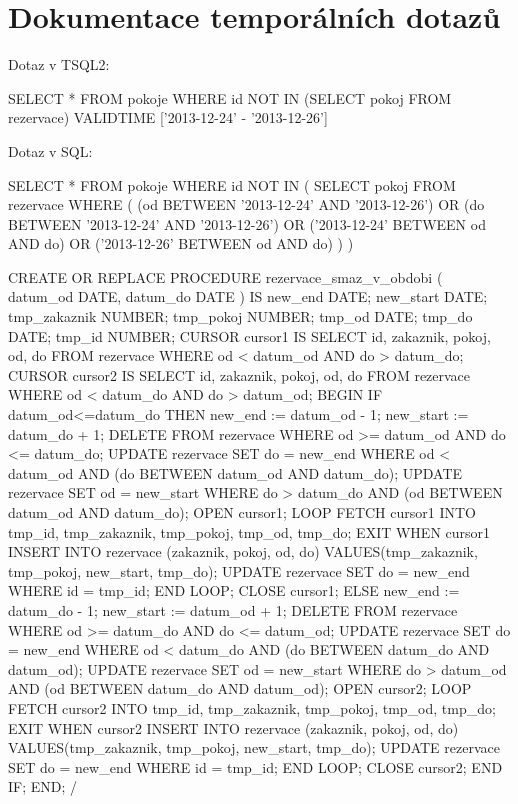 \documentclass[11pt,a4paper]{article}
\begin{document}
\section{Dokumentace temporálních dotazů}
Dotaz v TSQL2:
\begin{center}
\begin{boxedverbatim}
SELECT * FROM pokoje
WHERE id NOT IN (SELECT pokoj FROM rezervace)
VALIDTIME ['2013-12-24' - '2013-12-26']
\end{boxedverbatim}
\end{center}
Dotaz v SQL:
\begin{center}
\begin{boxedverbatim}
SELECT * FROM pokoje 
WHERE id NOT IN (
  SELECT pokoj FROM rezervace WHERE (
    (od BETWEEN '2013-12-24' AND '2013-12-26') OR
    (do BETWEEN '2013-12-24' AND '2013-12-26') OR
    ('2013-12-24' BETWEEN od AND do) OR
    ('2013-12-26' BETWEEN od AND do)
  )
)
\end{boxedverbatim}
\end{center}

\begin{center}
\begin{boxedverbatim}
CREATE OR REPLACE PROCEDURE rezervace_smaz_v_obdobi (
  datum_od DATE, datum_do DATE ) IS
new_end DATE;
new_start DATE;
tmp_zakaznik NUMBER;
tmp_pokoj NUMBER;
tmp_od DATE;
tmp_do DATE;
tmp_id NUMBER;
CURSOR cursor1 IS
        SELECT id, zakaznik, pokoj, od, do
        FROM rezervace WHERE od < datum_od AND do > datum_do;
CURSOR cursor2 IS
        SELECT id, zakaznik, pokoj, od, do
        FROM rezervace WHERE od < datum_do AND do > datum_od;
BEGIN
IF datum_od<=datum_do THEN
    new_end := datum_od - 1;
    new_start := datum_do + 1;
    DELETE FROM rezervace WHERE od >= datum_od AND do <= datum_do;
    UPDATE rezervace SET do = new_end
        WHERE od < datum_od AND (do BETWEEN datum_od AND datum_do);
    UPDATE rezervace SET od = new_start
        WHERE do > datum_do AND (od BETWEEN datum_od AND datum_do);
    OPEN cursor1;
    LOOP
        FETCH cursor1 INTO tmp_id, tmp_zakaznik, tmp_pokoj, tmp_od, tmp_do;
        EXIT WHEN cursor1%
        INSERT INTO rezervace (zakaznik, pokoj, od, do)
            VALUES(tmp_zakaznik, tmp_pokoj, new_start, tmp_do);
        UPDATE rezervace
            SET do = new_end WHERE id = tmp_id;
    END LOOP;
    CLOSE cursor1;
ELSE
    new_end := datum_do - 1;
    new_start := datum_od + 1;        
    DELETE FROM rezervace WHERE od >= datum_do AND do <= datum_od;
    UPDATE rezervace SET do = new_end
        WHERE od < datum_do AND (do BETWEEN datum_do AND datum_od);
    UPDATE rezervace SET od = new_start
        WHERE do > datum_od AND (od BETWEEN datum_do AND datum_od);
    OPEN cursor2;
    LOOP
        FETCH cursor2 INTO tmp_id, tmp_zakaznik, tmp_pokoj, tmp_od, tmp_do;
        EXIT WHEN cursor2%
        INSERT INTO rezervace (zakaznik, pokoj, od, do)
            VALUES(tmp_zakaznik, tmp_pokoj, new_start, tmp_do);
        UPDATE rezervace SET do = new_end WHERE id = tmp_id;
    END LOOP;
    CLOSE cursor2;
END IF;
END;
/
\end{boxedverbatim}
\end{center}
\end{document}
